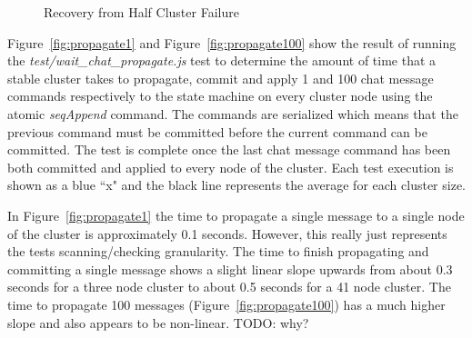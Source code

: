 \documentclass[conference,compsoc]{./IEEEtran/IEEEtran}
\begin{document}
\begin{figure}[!t]
    \caption{Recovery from Half Cluster Failure}
    \label{fig:recovery_half_failure}
\end{figure}



Figure~\ref{fig:propagate1} and Figure~\ref{fig:propagate100} show the
result of running the \emph{test/wait\_chat\_propagate.js} test to
determine the amount of time that a stable cluster takes to propagate,
commit and apply 1 and 100 chat message commands respectively to the state
machine on every cluster node using the atomic \emph{seqAppend}
command. The commands are serialized which means that the previous
command must be committed before the current command can be committed.
The test is complete once the last chat message command has been both
committed and applied to every node of the cluster. Each test execution
is shown as a blue ``x" and the black line represents the average for
each cluster size.

In Figure~\ref{fig:propagate1} the time to propagate a single message
to a single node of the cluster is approximately 0.1 seconds. However,
this really just represents the tests scanning/checking granularity.
The time to finish propagating and committing a single message shows
a slight linear slope upwards from about 0.3 seconds for a three node
cluster to about 0.5 seconds for a 41 node cluster. The time to
propagate 100 messages (Figure~\ref{fig:propagate100}) has a much
higher slope and also appears to be non-linear. TODO: why?
\end{document}
